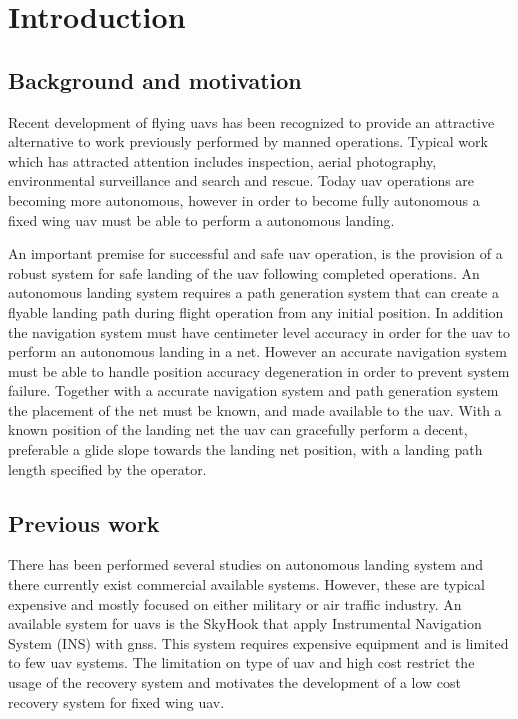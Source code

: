 \chapter{Introduction}
\section{Background and motivation}
Recent development of flying \glspl{uav} has been recognized to provide an attractive alternative to work previously performed by manned operations. Typical work which has attracted attention includes inspection, aerial photography, environmental surveillance and search and rescue. Today \gls{uav} operations are becoming more autonomous, however in order to become fully autonomous a fixed wing \gls{uav} must be able to perform a autonomous landing.

An important premise for successful and safe \gls{uav} operation, is the provision of a robust system for safe landing of the \gls{uav} following completed operations. An autonomous landing system requires a path generation system that can create a flyable landing path during flight operation from any initial position. In addition the navigation system must have centimeter level accuracy in order for the \gls{uav} to perform an autonomous landing in a net. However an accurate navigation system must be able to handle position accuracy degeneration in order to prevent system failure. Together with a accurate navigation system and path generation system the placement of the net must be known, and made available to the \gls{uav}. With a known position of the landing net the \gls{uav} can gracefully perform a decent, preferable a glide slope towards the landing net position, with a landing path length specified by the operator.
\section{Previous work}
There has been performed several studies on autonomous landing system and there currently exist commercial available systems. However, these are typical expensive and mostly focused on either military or air traffic industry. An available system for \glspl{uav} is the SkyHook that apply Instrumental Navigation System (INS) with \gls{gnss}\citep{SkyHook}. This system requires expensive equipment and is limited to few \gls{uav} systems. The limitation on type of \gls{uav} and high cost restrict the usage of the recovery system and motivates the development of a low cost recovery system for fixed wing \gls{uav}.

